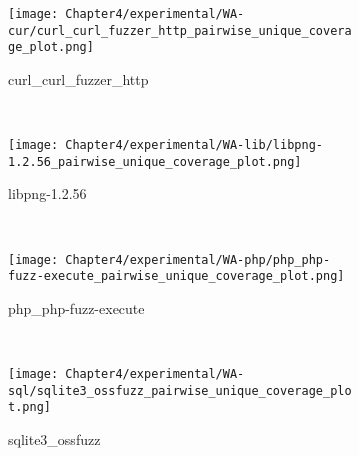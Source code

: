 \begin{figure}[!t]
    \begin{adjustbox}{center,max width=1.3\textwidth}
        \begin{subfigure}[t]{0.55\textwidth}
            \centering
            \texttt{[image: Chapter4/experimental/WA-cur/curl\_curl\_fuzzer\_http\_pairwise\_unique\_coverage\_plot.png]}
            \vspace*{-5mm}
            \caption{curl\_curl\_fuzzer\_http}
            \label{unq:a}
            \vspace*{5mm}
        \end{subfigure}
        ~
        \begin{subfigure}[t]{0.55\textwidth}
            \centering
            \texttt{[image: Chapter4/experimental/WA-lib/libpng-1.2.56\_pairwise\_unique\_coverage\_plot.png]}
            \vspace*{-5mm}
            \caption{libpng-1.2.56}
            \label{unq:b}
            \vspace*{5mm}
        \end{subfigure}
    \end{adjustbox}
    ~
    \begin{adjustbox}{center,max width=1.3\textwidth}
        \begin{subfigure}[t]{0.55\textwidth}
            \centering
            \texttt{[image: Chapter4/experimental/WA-php/php\_php-fuzz-execute\_pairwise\_unique\_coverage\_plot.png]}
            \vspace*{-5mm}
            \caption{php\_php-fuzz-execute}
            \label{unq:c}
            \vspace*{5mm}
        \end{subfigure}
        ~
        \begin{subfigure}[t]{0.55\textwidth}
            \centering
            \texttt{[image: Chapter4/experimental/WA-sql/sqlite3\_ossfuzz\_pairwise\_unique\_coverage\_plot.png]}
            \vspace*{-5mm}
            \caption{sqlite3\_ossfuzz}
            \label{unq:d}
            \vspace*{5mm}
        \end{subfigure}
    \end{adjustbox}
    ~
    \begin{adjustbox}{center,max width=1.3\textwidth}
        \begin{subfigure}[t]{0.55\textwidth}
            \centering

\end{subfigure}
\end{adjustbox}
\end{figure}
